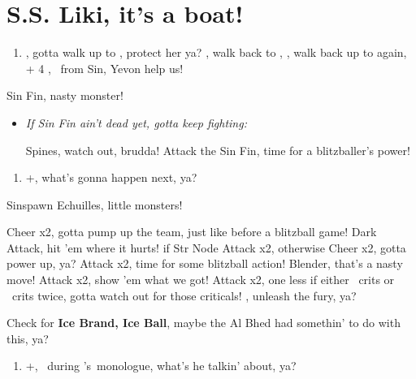 \chapter{S.S. Liki, it's a boat!}

\begin{enumerate}
    \item \cs[2:00], gotta walk up to \yuna, protect her ya? \sd, walk back to \wakka, \sd, walk back up to \yuna again, \cs + 4 \skippablefmv[4:20], \sd\ from Sin, Yevon help us!
\end{enumerate}
\begin{battle}[2000]{Sin Fin, nasty monster!}
    \begin{itemize}
        \tidusf Defend, gotta protect the team, ya?
        \switch{\yuna}{\lulu} Gotta get the right player in position, like blitzball, ya?
        \luluf Thunder the Sin Fin, show 'em the power of magic!
        \switch{\kimahri}{\yuna} Time to switch again, like a blitzball play, ya?
        \summon{\valefor} Time to call in the big guns!
        \valeforf Energy Ray \od\ on Sin Fin, that's the spirit!
        \enemyf Move x2 and Spines x2, watch out for those spines!
        \valeforf Thunder the Sin Fin, keep the pressure on!
        \enemyf Spines and Move, dodge 'em like a blitzball!
        \valeforf Thunder the Sin Fin x2, almost there!
        \item \textit{If Sin Fin ain't dead yet, gotta keep fighting:}
        \begin{itemize}
            \enemyf Spines, watch out, brudda!
            \switch{\tidus}{\wakka}
            \wakkaf Attack the Sin Fin, time for a blitzballer's power!
        \end{itemize}
    \end{itemize}
\end{battle}
\begin{enumerate}[resume]
    \item \fmv+\cs[1:40], what's gonna happen next, ya?
\end{enumerate}
\begin{battle}[2000]{Sinspawn Echuilles, little monsters!}
    \begin{itemize}
        \tidusf Cheer x2, gotta pump up the team, just like before a blitzball game!
        \wakkaf Dark Attack, hit 'em where it hurts!
        \tidusf if Str Node Attack x2, otherwise Cheer x2, gotta power up, ya?
        \wakkaf Attack x2, time for some blitzball action!
        \enemyf Blender, that's a nasty move!
        \wakkaf Attack x2, show 'em what we got!
        \tidusf Attack x2, one less if either \tidus\ crits or \wakka\ crits twice, gotta watch out for those criticals!
        \tidusf \od, unleash the fury, ya?
    \end{itemize}
    Check for \textbf{Ice Brand, Ice Ball}, maybe the Al Bhed had somethin' to do with this, ya?
\end{battle}
\begin{enumerate}[resume]
    \item \skippablefmv+\cs[1:30], \sd\ during \tidus's\ monologue, what's he talkin' about, ya?
\end{enumerate}
\wincb\losscb\bothcb\winnpsingle\lossnpsingle\bothnpsingle